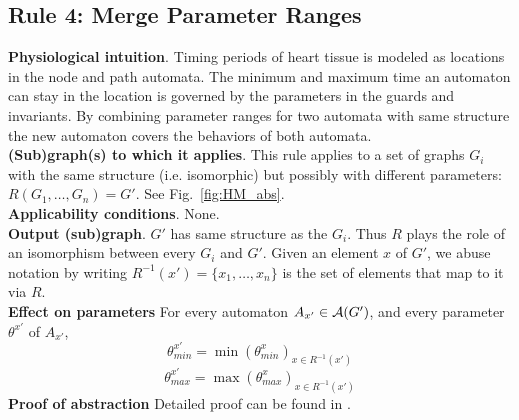 \subsection{Rule 4: Merge Parameter Ranges}
\textbf{Physiological intuition}. 
Timing periods of heart tissue is modeled as locations in the node and path automata. The minimum and maximum time an automaton can stay in the location is governed by the parameters in the guards and invariants. By combining parameter ranges for two automata with same structure the new automaton covers the behaviors of both automata.\\
\textbf{(Sub)graph(s) to which it applies}.
This rule applies to a set of graphs $G_i$ with the same structure (i.e. isomorphic) but possibly with different parameters: $R(G_1,\ldots,G_n) = G'$.
See Fig.~\ref{fig:HM_abs}.\\
\textbf{Applicability conditions}.
None.\\
\textbf{Output (sub)graph}.
$G'$ has same structure as the $G_i$.
Thus $R$ plays the role of an isomorphism between every $G_i$ and $G'$.
Given an element $x$ of $G'$, we abuse notation by writing $R^{-1}(x') = \{x_1,\dots,x_n\}$ is the set of elements that map to it via $R$.\\
\textbf{Effect on parameters}
For every automaton $A_{x'} \in \mathcal{A}(G')$, and every parameter $\theta^{x'}$ of $A_{x'}$, 
\[\theta_{min}^{x'} = \min(\theta^x_{min})_{x \in R^{-1}(x') }\]
\[\theta_{max}^{x'} = \max(\theta^x_{max})_{x \in R^{-1}(x') }\]
\textbf{Proof of abstraction} Detailed proof can be found in \cite{regar_tech}.

%

